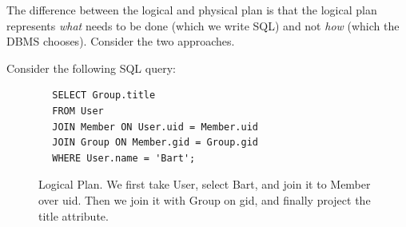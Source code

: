     The difference between the logical and physical plan is that the logical plan represents \textit{what} needs to be done (which we write SQL) and not \textit{how} (which the DBMS chooses). Consider the two approaches. 

    \begin{example}
      Consider the following SQL query:
      \begin{lstlisting}
        SELECT Group.title
        FROM User
        JOIN Member ON User.uid = Member.uid
        JOIN Group ON Member.gid = Group.gid
        WHERE User.name = 'Bart';
      \end{lstlisting}

      \begin{figure}[H]
        \centering 
        \caption{Logical Plan. We first take User, select Bart, and join it to Member over uid. Then we join it with Group on gid, and finally project the title attribute.} 
        \label{fig:logical_plan}
      \end{figure}


\end{example}
